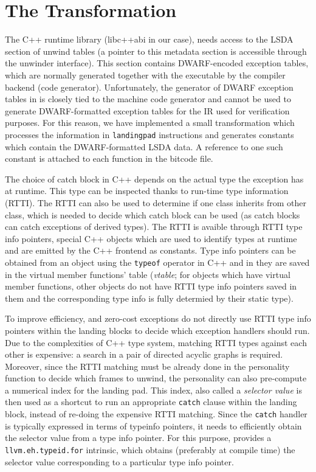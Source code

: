 \section{The \llvm{} Transformation}\label{sec:lang:transform}

The C++ runtime library (libc++abi in our case), needs access
to the LSDA section of unwind tables (a pointer to this metadata section
is accessible through the unwinder interface). This section contains
DWARF-encoded exception tables, which are normally generated together
with the executable by the compiler backend (code generator).
Unfortunately, the generator of DWARF exception tables in \llvm{} is
closely tied to the machine code generator and cannot be used to
generate DWARF-formatted exception tables for the \llvm{} IR used for
verification purposes.
For
this reason, we have implemented a small \llvm{} transformation which
processes the information in \texttt{landingpad} instructions and
generates \llvm{} constants which contain the DWARF-formatted LSDA data. A
reference to one such constant is attached to each function in the
bitcode file.

The choice of catch block in C++ depends on the actual type the exception has
at runtime.
This type can be inspected thanks to run-time type information (RTTI).
The RTTI can also be used to determine if one class inherits from other class,
which is needed to decide which catch block can be used (as catch blocks can
catch exceptions of derived types).
The RTTI is avaible through RTTI type info pointers, special C++ objects which
are used to identify types at runtime and are emitted by the C++ frontend as
constants. 
Type info pointers can be obtained from an object using the \texttt{typeof}
operator in C++ and in \llvm{} they are saved in the virtual member functions'
table (\emph{vtable}; for objects which have virtual member functions, other
objects do not have RTTI type info pointers saved in them and the corresponding
type info is fully determied by their static type).

To improve efficiency, \llvm{} and zero-cost exceptions do not directly use
RTTI type info pointers within the landing blocks to decide which exception
handlers should run.
Due to the complexities of C++ type system, matching RTTI
types against each other is expensive: a search in a pair of directed
acyclic graphs is required. Moreover, since the RTTI matching must be
already done in the personality function to decide which frames to
unwind, the personality can also pre-compute a numerical index for the
landing pad. This index, also called a \emph{selector value} is then
used as a shortcut to run an appropriate \texttt{catch} clause within
the landing block, instead of re-doing the expensive RTTI matching.
Since the \texttt{catch} handler is typically expressed in terms of
typeinfo pointers, it needs to efficiently obtain the selector value
from a type info pointer. For this purpose, \llvm{} provides a
\texttt{llvm.eh.typeid.for} intrinsic, which obtains (preferably at
compile time) the selector value corresponding to a particular type info
pointer.

